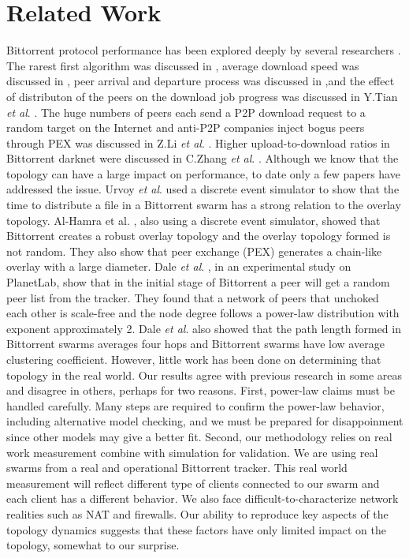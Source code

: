 \documentclass[10pt,conference,letterpaper,final]{IEEEtran}
\begin{document}
\section{Related Work}\label{relatedworks}
Bittorrent protocol performance has been explored deeply by several researchers \cite{guo2005measurements}\cite{legout2006rarest}\cite{pouwelse2004measurement}\cite{tian2007modeling}.  
The rarest first algorithm was discussed in \cite{legout2006rarest}, average download speed was discussed in \cite{pouwelse2004measurement}, peer arrival and departure process was discussed in \cite{guo2005measurements},and the effect of distributon of the peers on the download job progress was discussed in Y.Tian \textit{et al}. \cite{tian2007modeling}.
The huge numbers of peers each send a P2P download request to a random target on the Internet and anti-P2P companies inject bogus peers through PEX was discussed in Z.Li \textit{et al}. \cite{li2010measurement}.
Higher upload-to-download ratios in  Bittorrent darknet were discussed in C.Zhang \textit{et al}. \cite{zhang2010bittorrent}.
Although we know that the topology can have a large impact on performance, to date only a few papers have addressed the issue.
Urvoy \textit{et al}. \cite{urvoy2007impact} used a discrete event simulator to show that the time to distribute a file in a Bittorrent swarm has a strong relation to the overlay topology.  
Al-Hamra et al. \cite{al2007understanding}, also using a discrete event simulator, showed that Bittorrent creates a robust overlay topology and the overlay topology formed is not random. 
They also show that peer exchange (PEX) generates a chain-like overlay with a large diameter. 
Dale \textit{et al}. \cite{dale2008evolution}, in an experimental study on PlanetLab, show that in the initial stage of Bittorrent a peer will get a random peer list from the tracker. 
They found that a network of peers that unchoked each other is scale-free and the node degree follows a power-law distribution with exponent approximately 2. 
Dale \textit{et al}. \cite{dale2008evolution} also showed that the path length formed in Bittorrent swarms averages four hops and Bittorrent swarms have low average clustering coefficient.  
However, little work has been done on determining that topology in the real world. 
Our results agree with previous research \cite{dale2008evolution} in some areas and disagree in others, perhaps for two reasons.
First, power-law claims must be handled carefully. 
Many steps are required to confirm the power-law behavior, including alternative model checking, and we must be prepared for disappoinment since other models may give a better fit. 
Second, our methodology relies on real work measurement combine with simulation for validation. 
We are using real swarms from a real and operational Bittorrent tracker. 
This real world measurement will reflect different type of clients connected to our swarm and each client has a different behavior. 
We also face difficult-to-characterize network realities such as NAT and firewalls. 
Our ability to reproduce key aspects of the topology dynamics suggests that these factors have only limited impact on the topology, somewhat to our surprise. 
\end{document}
